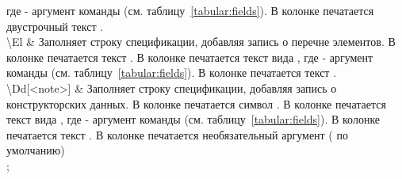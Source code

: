 \begin{tikztablex}
{где  - аргумент команды
(см. таблицу~\ref{tabular:fields}). В колонке
 печатается двустрочный текст
.\\
\textbackslash{}El &
Заполняет строку спецификации, добавляя запись о перечне элементов.
В колонке  печатается текст .
В колонке  печатается текст вида
, где  - аргумент команды
(см. таблицу~\ref{tabular:fields}). В колонке
 печатается текст
.\\
\textbackslash{}Dd[<note>] &
Заполняет строку спецификации, добавляя запись о конструкторских данных. В колонке
 печатается символ \sfemph{-}. В колонке
 печатается текст вида
, где  - аргумент команды
(см. таблицу~\ref{tabular:fields}). В колонке
 печатается текст . В колонке  печатается
необязательный аргумент ( по умолчанию)\\
};
\end{tikztablex}

\clearpage

